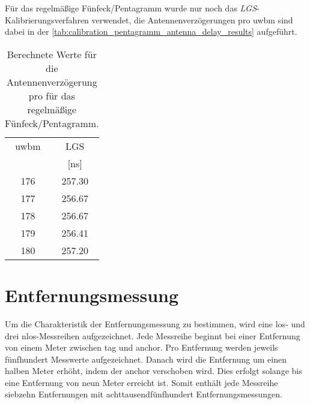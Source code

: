 Für das regelmäßige Fünfeck/Pentagramm wurde nur noch das \textit{LGS}-Ka\-li\-brie\-rungs\-ver\-fahren verwendet, die Antennenverzögerungen pro \Gls{uwbm} sind dabei in der \autoref{tab:calibration_pentagramm_antenna_delay_results} aufgeführt.

\begin{table}
	\centering
	\begin{tabular}{||c||c||}
\hline
\Gls{uwbm} & LGS \\
 & [\si{\nano\second}] \\
\hline\hline
176 & \num{257.30} \\
177 & \num{256.67} \\
178 & \num{256.67} \\
179 & \num{256.41} \\
180 & \num{257.20} \\

\hline
	\end{tabular}
	\caption{Berechnete Werte für die Antennenverzögerung pro  für das regelmäßige Fünfeck/Pentagramm.}
	\label{tab:calibration_pentagramm_antenna_delay_results}
\end{table}


%

%
\section{Entfernungsmessung}

Um die Charakteristik der Entfernungsmessung zu bestimmen, wird eine \Gls{los}- und drei \Gls{nlos}-Messreihen aufgezeichnet. Jede Messreihe beginnt bei einer Entfernung von einem Meter zwischen \Gls{tag} und \Gls{anchor}. Pro Entfernung werden jeweils fünfhundert Messwerte aufgezeichnet. Danach wird die Entfernung um einen halben Meter erhöht, indem der \Gls{anchor} verschoben wird. Dies erfolgt solange bis eine Entfernung von neun Meter erreicht ist. Somit enthält jede Messreihe siebzehn Entfernungen mit achttausendfünfhundert Entfernungsmessungen.

